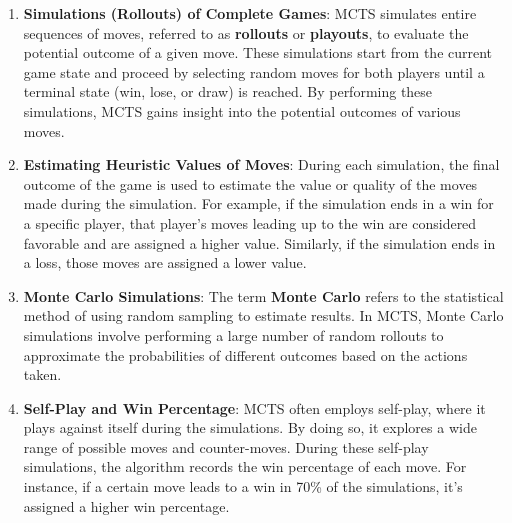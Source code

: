 \documentclass{article}
\begin{document}
\begin{enumerate}
    \item \textbf{Simulations (Rollouts) of Complete Games}:
    MCTS simulates entire sequences of moves, referred to as \textbf{rollouts} or \textbf{playouts}, to evaluate the potential outcome of a given move. These simulations start from the current game state and proceed by selecting random moves for both players until a terminal state (win, lose, or draw) is reached. By performing these simulations, MCTS gains insight into the potential outcomes of various moves.
    
    \item \textbf{Estimating Heuristic Values of Moves}:
    During each simulation, the final outcome of the game is used to estimate the value or quality of the moves made during the simulation. For example, if the simulation ends in a win for a specific player, that player's moves leading up to the win are considered favorable and are assigned a higher value. Similarly, if the simulation ends in a loss, those moves are assigned a lower value.
    
    \item \textbf{Monte Carlo Simulations}:
    The term \textbf{Monte Carlo} refers to the statistical method of using random sampling to estimate results. In MCTS, Monte Carlo simulations involve performing a large number of random rollouts to approximate the probabilities of different outcomes based on the actions taken.
    
    \item \textbf{Self-Play and Win Percentage}:
    MCTS often employs self-play, where it plays against itself during the simulations. By doing so, it explores a wide range of possible moves and counter-moves. During these self-play simulations, the algorithm records the win percentage of each move. For instance, if a certain move leads to a win in 70\% of the simulations, it's assigned a higher win percentage.
\end{enumerate}
\end{document}
